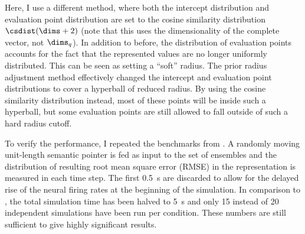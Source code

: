Here, I use a different method, where both the intercept distribution and evaluation point distribution are set to the cosine similarity distribution $\csdist(\dims + 2)$ (note that this uses the dimensionality of the complete vector, not $\dims_q$).
In addition to before, the distribution of evaluation points accounts for the fact that the represented values are no longer uniformly distributed.
This can be seen as setting a ``soft'' radius.
The prior radius adjustment method effectively changed the intercept and evaluation point distributions to cover a hyperball of reduced radius.
By using the cosine similarity distribution instead, most of these points will be inside such a hyperball, but some evaluation points are still allowed to fall outside of such a hard radius cutoff.

To verify the performance, I repeated the benchmarks from \textcite{gosmann216}\@.
A randomly moving unit-length semantic pointer is fed as input to the set of ensembles and the distribution of resulting root mean square error (RMSE) in the representation is measured in each time step.
The first \SI{0.5}{\second} are discarded to allow for the delayed rise of the neural firing rates at the beginning of the simulation.
In comparison to \textcite{gosmann216}, the total simulation time has been halved to \SI{5}{\second} and only \num{15} instead of \num{20} independent simulations have been run per condition.
These numbers are still sufficient to give highly significant results.

